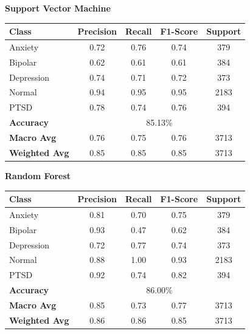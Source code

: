 \begin{center}
    \textbf{Support Vector Machine} \\[0.2em]
    \begin{tabular}{|l|c|c|c|c|}
        \hline
        \textbf{Class} & \textbf{Precision} & \textbf{Recall} & \textbf{F1-Score} & \textbf{Support} \\ \hline
        Anxiety        & 0.72               & 0.76            & 0.74              & 379              \\ \hline
        Bipolar        & 0.62               & 0.61            & 0.61              & 384              \\ \hline
        Depression     & 0.74               & 0.71            & 0.72              & 373              \\ \hline
        Normal         & 0.94               & 0.95            & 0.95              & 2183             \\ \hline
        PTSD           & 0.78               & 0.74            & 0.76              & 394              \\ \hline
        \textbf{Accuracy} & \multicolumn{4}{|c|}{85.13\%} \\ \hline
        \textbf{Macro Avg} & 0.76            & 0.75            & 0.76              & 3713             \\ \hline
        \textbf{Weighted Avg} & 0.85         & 0.85            & 0.85              & 3713             \\ \hline
    \end{tabular}
\end{center}


\begin{center}
    \textbf{Random Forest} \\[0.2em]
    \begin{tabular}{|l|c|c|c|c|}
        \hline
        \textbf{Class} & \textbf{Precision} & \textbf{Recall} & \textbf{F1-Score} & \textbf{Support} \\ \hline
        Anxiety        & 0.81               & 0.70            & 0.75              & 379              \\ \hline
        Bipolar        & 0.93               & 0.47            & 0.62              & 384              \\ \hline
        Depression     & 0.72               & 0.77            & 0.74              & 373              \\ \hline
        Normal         & 0.88               & 1.00            & 0.93              & 2183             \\ \hline
        PTSD           & 0.92               & 0.74            & 0.82              & 394              \\ \hline
        \textbf{Accuracy} & \multicolumn{4}{|c|}{86.00\%} \\ \hline
        \textbf{Macro Avg} & 0.85            & 0.73            & 0.77              & 3713             \\ \hline
        \textbf{Weighted Avg} & 0.86         & 0.86            & 0.85              & 3713             \\ \hline
    \end{tabular}
\end{center}


